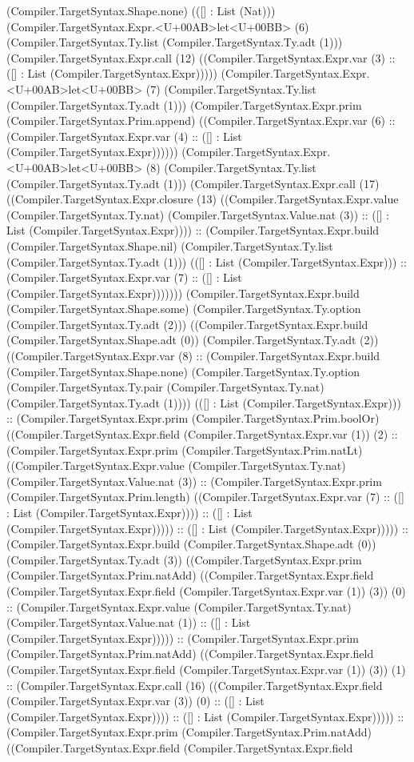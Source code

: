 \documentclass[11pt]{article}
\begin{document}
(Compiler.TargetSyntax.Shape.none) (([] : List (Nat))) (Compiler.TargetSyntax.Expr.<U+00AB>let<U+00BB> (6) (Compiler.TargetSyntax.Ty.list (Compiler.TargetSyntax.Ty.adt (1))) (Compiler.TargetSyntax.Expr.call (12) ((Compiler.TargetSyntax.Expr.var (3) :: ([] : List (Compiler.TargetSyntax.Expr))))) (Compiler.TargetSyntax.Expr.<U+00AB>let<U+00BB> (7) (Compiler.TargetSyntax.Ty.list (Compiler.TargetSyntax.Ty.adt (1))) (Compiler.TargetSyntax.Expr.prim (Compiler.TargetSyntax.Prim.append) ((Compiler.TargetSyntax.Expr.var (6) :: (Compiler.TargetSyntax.Expr.var (4) :: ([] : List (Compiler.TargetSyntax.Expr)))))) (Compiler.TargetSyntax.Expr.<U+00AB>let<U+00BB> (8) (Compiler.TargetSyntax.Ty.list (Compiler.TargetSyntax.Ty.adt (1))) (Compiler.TargetSyntax.Expr.call (17) ((Compiler.TargetSyntax.Expr.closure (13) ((Compiler.TargetSyntax.Expr.value (Compiler.TargetSyntax.Ty.nat) (Compiler.TargetSyntax.Value.nat (3)) :: ([] : List (Compiler.TargetSyntax.Expr)))) :: (Compiler.TargetSyntax.Expr.build (Compiler.TargetSyntax.Shape.nil) (Compiler.TargetSyntax.Ty.list (Compiler.TargetSyntax.Ty.adt (1))) (([] : List (Compiler.TargetSyntax.Expr))) :: (Compiler.TargetSyntax.Expr.var (7) :: ([] : List (Compiler.TargetSyntax.Expr))))))) (Compiler.TargetSyntax.Expr.build (Compiler.TargetSyntax.Shape.some) (Compiler.TargetSyntax.Ty.option (Compiler.TargetSyntax.Ty.adt (2))) ((Compiler.TargetSyntax.Expr.build (Compiler.TargetSyntax.Shape.adt (0)) (Compiler.TargetSyntax.Ty.adt (2)) ((Compiler.TargetSyntax.Expr.var (8) :: (Compiler.TargetSyntax.Expr.build (Compiler.TargetSyntax.Shape.none) (Compiler.TargetSyntax.Ty.option (Compiler.TargetSyntax.Ty.pair (Compiler.TargetSyntax.Ty.nat) (Compiler.TargetSyntax.Ty.adt (1)))) (([] : List (Compiler.TargetSyntax.Expr))) :: (Compiler.TargetSyntax.Expr.prim (Compiler.TargetSyntax.Prim.boolOr) ((Compiler.TargetSyntax.Expr.field (Compiler.TargetSyntax.Expr.var (1)) (2) :: (Compiler.TargetSyntax.Expr.prim (Compiler.TargetSyntax.Prim.natLt) ((Compiler.TargetSyntax.Expr.value (Compiler.TargetSyntax.Ty.nat) (Compiler.TargetSyntax.Value.nat (3)) :: (Compiler.TargetSyntax.Expr.prim (Compiler.TargetSyntax.Prim.length) ((Compiler.TargetSyntax.Expr.var (7) :: ([] : List (Compiler.TargetSyntax.Expr)))) :: ([] : List (Compiler.TargetSyntax.Expr))))) :: ([] : List (Compiler.TargetSyntax.Expr))))) :: (Compiler.TargetSyntax.Expr.build (Compiler.TargetSyntax.Shape.adt (0)) (Compiler.TargetSyntax.Ty.adt (3)) ((Compiler.TargetSyntax.Expr.prim (Compiler.TargetSyntax.Prim.natAdd) ((Compiler.TargetSyntax.Expr.field (Compiler.TargetSyntax.Expr.field (Compiler.TargetSyntax.Expr.var (1)) (3)) (0) :: (Compiler.TargetSyntax.Expr.value (Compiler.TargetSyntax.Ty.nat) (Compiler.TargetSyntax.Value.nat (1)) :: ([] : List (Compiler.TargetSyntax.Expr))))) :: (Compiler.TargetSyntax.Expr.prim (Compiler.TargetSyntax.Prim.natAdd) ((Compiler.TargetSyntax.Expr.field (Compiler.TargetSyntax.Expr.field (Compiler.TargetSyntax.Expr.var (1)) (3)) (1) :: (Compiler.TargetSyntax.Expr.call (16) ((Compiler.TargetSyntax.Expr.field (Compiler.TargetSyntax.Expr.var (3)) (0) :: ([] : List (Compiler.TargetSyntax.Expr)))) :: ([] : List (Compiler.TargetSyntax.Expr))))) :: (Compiler.TargetSyntax.Expr.prim (Compiler.TargetSyntax.Prim.natAdd) ((Compiler.TargetSyntax.Expr.field (Compiler.TargetSyntax.Expr.field 
\end{document}
